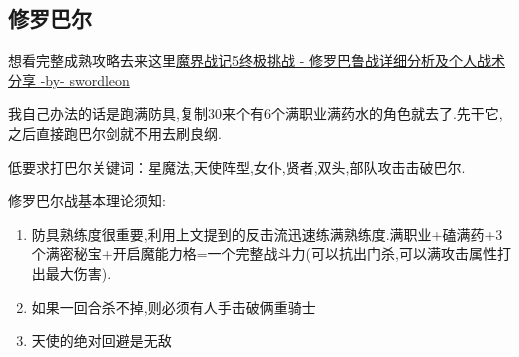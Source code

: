 	\subsection{修罗巴尔}

	想看完整成熟攻略去来这里\href{http://tieba.baidu.com/p/3949061316}{魔界战记5终极挑战 - 修罗巴鲁战详细分析及个人战术分享 -by- swordleon }

	我自己办法的话是跑满防具,复制30来个有6个满职业满药水的角色就去了.先干它,之后直接跑巴尔剑就不用去刷良纲.

	低要求打巴尔关键词：星魔法,天使阵型,女仆,贤者,双头,部队攻击击破巴尔.



	修罗巴尔战基本理论须知:

	\begin{enumerate}
		\item 
		防具熟练度很重要,利用上文提到的反击流迅速练满熟练度.满职业+磕满药+3个满密秘宝+开启魔能力格=一个完整战斗力(可以抗出门杀,可以满攻击属性打出最大伤害).

		\item
		如果一回合杀不掉,则必须有人手击破俩重骑士

		\item
		天使的绝对回避是无敌

	\end{enumerate}
	




